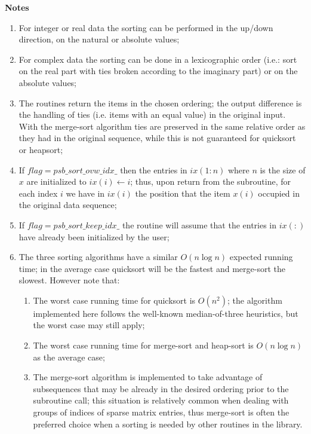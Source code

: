 {\goodbreak\par\noindent\large\bfseries Notes}
\begin{enumerate}
\item For integer or real data the sorting can be performed in the up/down direction, on the
  natural or absolute values;
\item For  complex data the sorting can  be done in a lexicographic
  order (i.e.: sort on the real part with ties broken according to
  the imaginary part) or on the absolute values; 
\item The routines return the items in the chosen ordering; the
  output difference is the handling of  ties (i.e. items with an
  equal   value) in the original input. With the merge-sort algorithm
  ties are   preserved in the same relative order as they had in the
  original   sequence,  while this is not guaranteed for quicksort or
  heapsort; 
\item If $flag = psb\_sort\_ovw\_idx\_$ then the entries in $ix(1:n)$
  where $n$ is the size of $x$ are initialized to $ix(i) \leftarrow
  i$; thus, upon return from the subroutine, for each
  index $i$ we have in $ix(i)$ the position that the item $x(i)$
  occupied in the original data sequence;
\item If $flag = psb\_sort\_keep\_idx\_$  the routine will assume that
  the entries in $ix(:)$ have already been initialized by the user;
\item The three sorting algorithms have a similar $O(n \log n)$ expected
  running time; in the average case quicksort will be the
  fastest and merge-sort the slowest. However note that:
\begin{enumerate}
\item The worst case running time for quicksort is $O(n^2)$; the algorithm
  implemented here follows the well-known median-of-three heuristics,
  but the worst case may still apply;
\item The worst case running time for merge-sort and heap-sort is
  $O(n\log n)$  as the average case;
\item The merge-sort algorithm is implemented to take advantage of 
  subsequences that may be already in the desired ordering prior to
  the subroutine call; this situation is relatively common when
  dealing with groups of indices of sparse matrix entries, thus
  merge-sort is often the preferred  choice when a sorting is needed
  by other routines in the library. 
\end{enumerate}
\end{enumerate}



